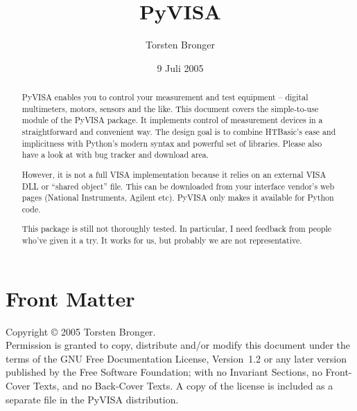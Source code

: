 \documentclass{howto}
\title{PyVISA}
\author{Torsten Bronger}
\date{9 Juli 2005}
\begin{document}
\maketitle

\ifhtml
\chapter*{Front Matter\label{front}}
\fi

Copyright \copyright{} 2005 Torsten Bronger.\\
Permission is granted to copy, distribute and/or modify this document under the
terms of the GNU Free Documentation License, Version~1.2 or any later version
published by the Free Software Foundation; with no Invariant Sections, no
Front-Cover Texts, and no Back-Cover Texts.  A copy of the license is included
as a separate file  in the PyVISA distribution.

\begin{abstract}

\noindent
PyVISA enables you to control your measurement and test equipment -- digital
multimeters, motors, sensors and the like.  This document covers the
simple-to-use  module of the PyVISA package.  It implements
control of measurement devices in a straightforward and convenient way.  The
design goal is to combine HTBasic's ease and implicitness with Python's modern
syntax and powerful set of libraries.  Please also have a look at
 with bug
tracker and download area.

However, it is not a full VISA implementation because it relies on an external
VISA DLL or ``shared object'' file.  This can be downloaded from your interface
vendor's web pages (National Instruments, Agilent etc).  PyVISA only makes it
available for Python code.

This package is still not thoroughly tested.  In particular, I need feedback
from people who've given it a try.  It works for us, but probably we are not
representative.
\end{abstract}

\begin{samepage}
  \tableofcontents
\end{samepage}

\end{document}
